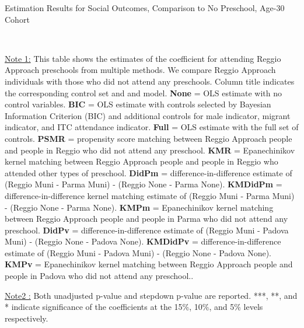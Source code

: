 \begin{table}[H] \caption{Estimation Results for Social Outcomes, Comparison to No Preschool, Age-30 Cohort} \label{ols-S-adult30-reg-none}
\scalebox{0.6}{}
\vspace{1ex} \\
\footnotesize\raggedright{\underline{Note 1:} This table shows the estimates of the coefficient for attending Reggio Approach preschools from multiple methods. We compare Reggio Approach individuals with those who did not attend any preschools. Column title indicates the corresponding control set and and model. \textbf{None} = OLS estimate with no control variables. \textbf{BIC} = OLS estimate with controls selected by Bayesian Information Criterion (BIC) and additional controls for male indicator, migrant indicator, and ITC attendance indicator. \textbf{Full} = OLS estimate with the full set of controls. \textbf{PSMR} =  propensity score matching between Reggio Approach people and people in Reggio who did not attend any preschool. \textbf{KMR} = Epanechinikov kernel matching between Reggio Approach people and people in Reggio who attended other types of preschool. \textbf{DidPm} = difference-in-difference estimate of (Reggio Muni - Parma Muni) - (Reggio None - Parma None). \textbf{KMDidPm} = difference-in-difference kernel matching estimate of (Reggio Muni - Parma Muni) - (Reggio None - Parma None). \textbf{KMPm} = Epanechinikov kernel matching between Reggio Approach people and people in Parma who did not attend any preschool. \textbf{DidPv} = difference-in-difference estimate of (Reggio Muni - Padova Muni) - (Reggio None - Padova None). \textbf{KMDidPv} = difference-in-difference estimate of (Reggio Muni - Padova Muni) - (Reggio None - Padova None). \textbf{KMPv} = Epanechinikov kernel matching between Reggio Approach people and people in Padova who did not attend any preschool..} 

\footnotesize\raggedright{\underline{Note2 :} Both unadjusted p-value and stepdown p-value are reported. ***, **, and * indicate significance of the coefficients at the 15\%, 10\%, and 5\% levels respectively.}
\end{table}













